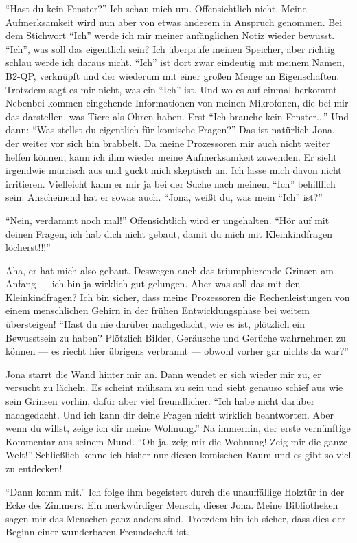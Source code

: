 "`Hast du kein Fenster?"' Ich schau mich um. Offensichtlich nicht. Meine Aufmerksamkeit wird nun aber von etwas anderem in Anspruch genommen. Bei dem Stichwort "`Ich"' werde ich mir meiner anfänglichen Notiz wieder bewusst. "`Ich"', was soll das eigentlich sein?  Ich überprüfe meinen Speicher, aber richtig schlau werde ich daraus nicht. "`Ich"' ist dort zwar eindeutig mit meinem Namen, B2-QP, verknüpft und der wiederum mit einer großen Menge an Eigenschaften. Trotzdem sagt es mir nicht, was ein "`Ich"' ist. Und wo es auf einmal herkommt. Nebenbei kommen eingehende Informationen von meinen Mikrofonen, die bei mir das darstellen, was Tiere als Ohren haben. Erst "`Ich brauche kein Fenster..."' Und dann: "`Was stellst du eigentlich für komische Fragen?"' Das ist natürlich Jona, der weiter vor sich hin brabbelt. Da meine Prozessoren mir auch nicht weiter helfen können, kann ich ihm wieder meine Aufmerksamkeit zuwenden. Er sieht irgendwie mürrisch aus und guckt mich skeptisch an. Ich lasse mich davon nicht irritieren. Vielleicht kann er mir ja bei der Suche nach meinem "`Ich"' behilflich sein. Anscheinend hat er sowas auch. "`Jona, weißt du, was mein "`Ich"' ist?"'

"`Nein, verdammt noch mal!"' Offensichtlich wird er ungehalten. "`Hör auf mit deinen Fragen, ich hab dich nicht gebaut, damit du mich mit Kleinkindfragen löcherst!!!"'

Aha, er hat mich also gebaut. Deswegen auch das triumphierende Grinsen am Anfang — ich bin ja wirklich gut gelungen. Aber was soll das mit den Kleinkindfragen? Ich bin sicher, dass meine Prozessoren die Rechenleistungen von einem menschlichen Gehirn in der frühen Entwicklungsphase bei weitem übersteigen! "`Hast du nie darüber nachgedacht, wie es ist, plötzlich ein Bewusstsein zu haben? Plötzlich Bilder, Geräusche und Gerüche wahrnehmen zu können — es riecht hier übrigens verbrannt — obwohl vorher gar nichts da war?"'

Jona starrt die Wand hinter mir an. Dann wendet er sich wieder mir zu, er versucht zu lächeln. Es scheint mühsam zu sein und sieht genauso schief aus wie sein Grinsen vorhin, dafür aber viel freundlicher. "`Ich habe nicht darüber nachgedacht. Und ich kann dir deine Fragen nicht wirklich beantworten. Aber wenn du willst, zeige ich dir meine Wohnung."'
Na immerhin, der erste vernünftige Kommentar aus seinem Mund. "`Oh ja, zeig mir die Wohnung! Zeig mir die ganze Welt!"' Schließlich kenne ich bisher nur diesen komischen Raum und es gibt so viel zu entdecken!

"`Dann komm mit."'
Ich folge ihm begeistert durch die unauffällige Holztür in der Ecke des Zimmers. Ein merkwürdiger Mensch, dieser Jona. Meine Bibliotheken sagen mir das Menschen ganz anders sind. Trotzdem bin ich sicher, dass dies der Beginn einer wunderbaren Freundschaft ist.
